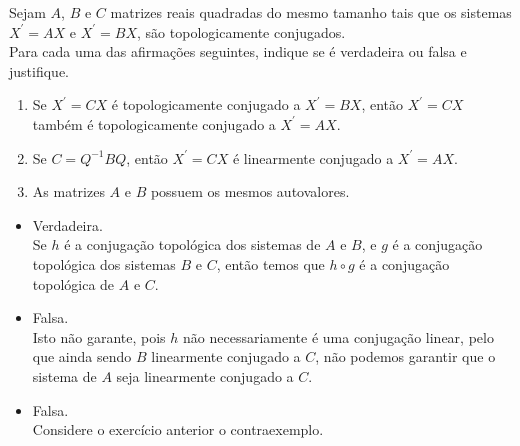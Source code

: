 \begin{homeworkProblem}[5]
  Sejam $A$, $B$ e $C$ matrizes reais quadradas do mesmo tamanho tais que os sistemas $X^{\prime}=AX$ e $X^{\prime}=BX$, são topologicamente conjugados.\\
  Para cada uma das afirmações seguintes, indique se é verdadeira ou falsa e justifique.
  \begin{enumerate}
    \item Se $X^{\prime}=CX$ é topologicamente conjugado a $X^{\prime}=BX$, então $X^{\prime}=CX$ também é topologicamente conjugado a $X^{\prime}=AX$. 
    \item Se $C=Q^{-1}BQ$, então $X^{\prime}=CX$ é linearmente conjugado a $X^{\prime}=AX$.
    \item As matrizes $A$ e $B$ possuem os mesmos autovalores.
  \end{enumerate}
  \begin{solution}
  \begin{itemize}
    \item Verdadeira.\\
      Se $h$ é a conjugação topológica dos sistemas de $A$ e $B$, e $g$ é a conjugação topológica dos sistemas $B$ e $C$, então temos que $h\circ g$ é a conjugação topológica de $A$ e $C$.
    \item Falsa.\\
      Isto não garante, pois $h$ não necessariamente é uma conjugação linear, pelo que ainda sendo $B$ linearmente conjugado a $C$, não podemos garantir que o sistema de $A$ seja linearmente conjugado a $C$.
    \item Falsa.\\
      Considere o exercício anterior o contraexemplo.
  \end{itemize} 
  \end{solution}
\end{homeworkProblem}
